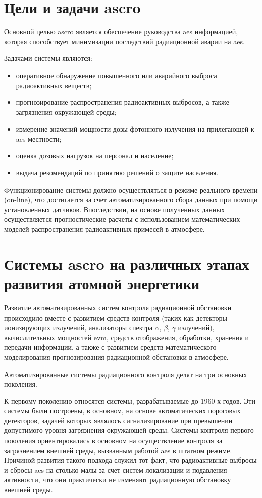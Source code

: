 \section{Цели и задачи \ac{ascro} \cite{elokhin}}

Основной целью \ac{ascro} является обеспечение руководства \ac{aes} информацией, которая способствует минимизации 
последствий радиационной аварии на \ac{aes}. 

Задачами системы являются:

\begin{itemize}
	\item оперативное обнаружение повышенного или аварийного выброса радиоактивных веществ;
	\item прогнозирование распространения радиоактивных выбросов, а также загрязнения окружающей среды;
	\item измерение значений мощности дозы фотонного излучения на прилегающей к \ac{aes} местности;
	\item оценка дозовых нагрузок на персонал и население;
	\item выдача рекомендаций по принятию решений о защите населения.
\end{itemize}

Функционирование системы должно осуществляться в режиме реального времени (on-line), что достигается за счет 
автоматизированного сбора данных при помощи установленных датчиков. Впоследствии, на основе полученных данных 
осуществляется прогностические расчеты с использованием математических моделей распространения радиоактивных примесей в 
атмосфере.

\section{Системы \ac{ascro} на различных этапах развития атомной энергетики \cite{elokhin}}

Развитие автоматизированных систем контроля радиационной обстановки происходило вместе с развитием средств контроля
(таких как детекторы ионизирующих излучений, анализаторы спектра $\alpha$, $\beta$, $\gamma$ излучений), вычислительных 
мощностей \ac{evm}, средств отображения, обработки, хранения и передачи информации, а также с развитием средств 
математического моделирования прогнозирования радиационной обстановки в атмосфере.

Автоматизированные системы радиационного контроля делят на три основных поколения.

К первому поколению относятся системы, разрабатываемые до 1960-х годов. Эти системы были построены, в основном, на 
основе автоматических пороговых детекторов, задачей которых являлось сигнализирование при превышении допустимого уровня 
загрязнения окружающей среды. Системы контроля первого поколения ориентировались в основном на осуществление контроля 
за загрязнением внешней среды, вызванным работой \ac{aes} в штатном режиме. Причиной развития такого подхода служил тот 
факт, что радиоактивные выбросы и сбросы \ac{aes} на столько малы за счет систем локализации и подавления активности, 
что они практически не изменяют радиационную обстановку внешней среды.

